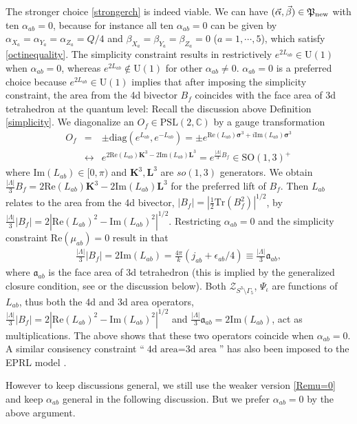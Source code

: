 \documentclass[aps,prd,notitlepage,nofootinbib,superscriptaddress,groupedaddress,twocolumn]{revtex4-1}
\newcommand{\PSlc}{\mathrm{PSL}(2,\mathbb{C})}
\def\be{\begin{eqnarray}}
\def\ee{\end{eqnarray}}
\newcommand{\cz}{\mathcal Z}
\newcommand{\fa}{\mathfrak{a}}  \newcommand{\Fa}{\mathfrak{A}}
\renewcommand{\a}{\alpha}
\renewcommand{\b}{\beta}
\newcommand{\G}{\Gamma}
\newcommand{\sig}{\sigma}
\renewcommand{\L }{\Lambda}
\begin{document}
The stronger choice \eqref{strongerch} is indeed viable. We can have $(\vec{\a},\vec{\b})\in \Fp_{\rm new}$ with ten $\a_{ab}=0$, because for instance all ten $\a_{ab}=0$ can be given by $\a_{X_a}=\a_{Y_a}=\a_{Z_a}=Q/4$ and $\b_{X_a}=\b_{Y_a}=\b_{Z_a}=0$ ($a=1,\cdots,5$), which satisfy \eqref{octinequality}. The simplicity constraint results in restrictively $e^{2L_{ab}}\in \mathrm{U(1)}$ when $\a_{ab}=0$, whereas $e^{2L_{ab}}\not\in \mathrm{U(1)}$ for other $\a_{ab}\neq 0$. $\a_{ab}=0$ is a preferred choice because $e^{2L_{ab}}\in\mathrm{U(1)}$ implies that after imposing the simplicity constraint, the area from the 4d bivector $B_f$ coincides with the face area of 3d tetrahedron at the quantum level: Recall the discussion above Definition \ref{simplicity}. We diagonalize an $O_f\in\PSlc$ by a gauge transformation 
\be
O_f&=&\pm\mathrm{diag}(e^{L_{ab}},e^{-L_{ab}})=\pm e^{\mathrm{Re}(L_{ab})\bm{\sig}^3+i\mathrm{Im}(L_{ab})\bm{\sig}^3}\nonumber\\
&\leftrightarrow& e^{2\mathrm{Re}(L_{ab})\mathbf{K}^3-2\mathrm{Im}(L_{ab})\mathbf{L}^3}=e^{\frac{|\L|}{3}B_f}\in \mathrm{SO(1,3)}^+\nonumber
\ee 
where $\mathrm{Im}(L_{ab})\in[0,\pi)$ and $\mathbf{K}^3,\mathbf{L}^3$ are $ so(1,3)$ generators. We obtain $\frac{|\L|}{3}B_f=2\mathrm{Re}(L_{ab})\mathbf{K}^3-2\mathrm{Im}(L_{ab})\mathbf{L}^3$ for the preferred lift of $B_f$. Then $L_{ab}$ relates to the area from the 4d bivector, $|B_f|=|\frac{1}{2}\mathrm{Tr}(B_f^{2})|^{1/2}$, by $\frac{|\L|}{3}|B_f|=2|\mathrm{Re}(L_{ab})^2-\mathrm{Im}(L_{ab})^2|^{1/2}$. Restricting $\a_{ab}=0$ and the simplicity constraint $\mathrm{Re}(\mu_{ab})=0$ result in that 
\be
\!\!\!\!\!\!\!\!\! \frac{|\L|}{3}|B_f|=2\mathrm{Im}(L_{ab})=\frac{4\pi }{k}(j_{ab}+\epsilon_{ab}/4)\equiv\frac{|\L|}{3}\fa_{ab},\label{Bfaab}
\ee 
where $\fa_{ab}$ is the face area of 3d tetrahedron (this is implied by the generalized closure condition, see \cite{curvedMink} or the discussion below). Both $\cz_{S^3\setminus\G_5}$, $\Psi_\iota$ are functions of $L_{ab}$, thus both the 4d and 3d area operators, $\frac{|\L|}{3}|B_f|=2|\mathrm{Re}(L_{ab})^2-\mathrm{Im}(L_{ab})^2|^{1/2}$ and $\frac{|\L|}{3}\fa_{ab}=2\mathrm{Im}(L_{ab})$, act as multiplications. The above shows that these two operators coincide when $\a_{ab}=0$. A similar consisency constraint ``$\text{4d area} = \text{3d area}$'' has also been imposed to the EPRL model \cite{generalize}. 


However to keep discussions general, we still use the weaker version \eqref{Remu=0} and keep $\a_{ab}$ general in the following discussion. But we prefer $\a_{ab}= 0$ by the above argument.
\end{document}
